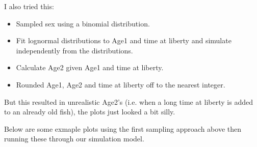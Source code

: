 \documentclass[11pt, a4paper]{article}
\begin{document}
I also tried this:
\begin{itemize}
\item Sampled sex using a binomial distribution.
\item Fit lognormal distributions to Age1 and time at liberty and simulate
  independently from the distributions.
\item Calculate Age2 given Age1 and time at liberty.
\item Rounded Age1, Age2 and time at liberty off to the nearest integer.
\end{itemize}
But this resulted in unrealistic Age2's (i.e. when a long time at liberty is
added to an already old fish), the plots just looked a bit silly.

Below are some exmaple plots using the first sampling approach above then
running these through our simulation model. 
\end{document}
